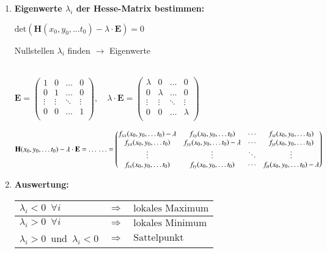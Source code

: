 \begin{enumerate}[itemsep=1ex]
    \item \textbf{Eigenwerte $\lambda_i$ der Hesse-Matrix bestimmen:}

    $\text{det}\left(\mathbf{H}(x_0,y_0,\ldots t_0) - \lambda \cdot \mathbf{E}\right)  = 0$

    Nullstellen $\lambda_i$ finden $\rightarrow  $ Eigenwerte

    \medskip
    \\
    $\mathbf{E} = \begin{pmatrix}
        1&0&\ldots &0\\
        0&1&\ldots&0\\
        \vdots &\vdots &\ddots &\vdots \\
        0&0&\ldots&1\\
    \end{pmatrix}
    , \quad
    \lambda \cdot \mathbf{E} = \begin{pmatrix}
        \lambda&0&\ldots &0\\
        0&\lambda&\ldots&0\\
        \vdots &\vdots &\ddots &\vdots \\
        0&0&\ldots&\lambda\\
    \end{pmatrix}$

    \medskip
    $\mathbf{H}(x_0,y_0,\ldots t_0) - \lambda \cdot \mathbf{E} = \ldots \\
    \ldots  = 
    \begin{pmatrix}
        f_{xx}(x_0,y_0,\ldots t_0)- \lambda&f_{xy}(x_0,y_0, \ldots t_0)&\cdots &f_{xt}(x_0,y_0,\ldots t_0)\\
        f_{yx}(x_0,y_0,\ldots t_0)&f_{yy}(x_0,y_0, \ldots t_0)- \lambda&\cdots &f_{yt}(x_0,y_0,\ldots t_0)\\
        \vdots &\vdots &\ddots &\vdots \\
        f_{tx}(x_0,y_0,\ldots t_0)&f_{ty}(x_0,y_0, \ldots t_0)&\cdots &f_{tt}(x_0,y_0,\ldots t_0)- \lambda\end{pmatrix}$

    \item \textbf{Auswertung:}
    
    \begin{tabular}{lll}
        \hline
        $\lambda_i < 0 \,\,\,\forall i$ &$\Longrightarrow$& $\text{lokales Maximum}$\\
        \hline
        $\lambda_i > 0 \,\,\,\forall i$ &$\Longrightarrow$& $\text{lokales Minimum}$\\
        \hline
        $\lambda_i > 0\,$ und $\,\lambda_i < 0$ &$\Longrightarrow$& $\text{Sattelpunkt}$\\
        \hline
    \end{tabular}


\end{enumerate}

